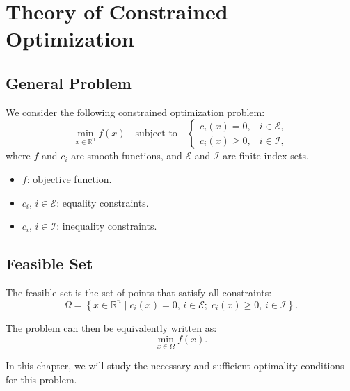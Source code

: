 \chapter{Theory of Constrained Optimization}
\label{chap:constrained-optimization}

\section{General Problem}

We consider the following constrained optimization problem:
\begin{equation}
    \min_{x \in \mathbb{R}^n} f(x) \quad \text{subject to} \quad
    \begin{cases}
        c_i(x) = 0, & i \in \mathcal{E}, \\
        c_i(x) \geq 0, & i \in \mathcal{I},
    \end{cases}
\end{equation}
where $f$ and $c_i$ are smooth functions, and $\mathcal{E}$ and $\mathcal{I}$ are finite index sets.

\begin{itemize}
    \item $f$: objective function.
    \item $c_i$, $i \in \mathcal{E}$: equality constraints.
    \item $c_i$, $i \in \mathcal{I}$: inequality constraints.
\end{itemize}

\section{Feasible Set}

\begin{definition}
The feasible set is the set of points that satisfy all constraints:
\begin{equation}
    \Omega = \left\{ x \in \mathbb{R}^n \mid c_i(x) = 0, \, i \in \mathcal{E} ; \; c_i(x) \geq 0, \, i \in \mathcal{I} \right\}.
\end{equation}
\end{definition}

The problem can then be equivalently written as:
\begin{equation}
    \min_{x \in \Omega} f(x).
\end{equation}

In this chapter, we will study the necessary and sufficient optimality conditions for this problem.

